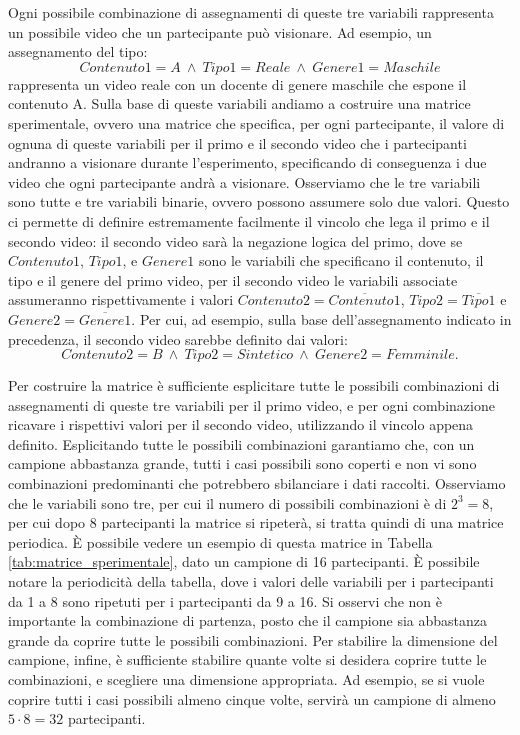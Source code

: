 Ogni possibile combinazione di assegnamenti di queste tre variabili rappresenta un possibile video che un partecipante può visionare. Ad esempio, un assegnamento del tipo: $$Contenuto1 = A \ \wedge \ Tipo1 = Reale \ \wedge \ Genere1 = Maschile$$ rappresenta un video reale con un docente di genere maschile che espone il contenuto A. Sulla base di queste variabili andiamo a costruire una matrice sperimentale, ovvero una matrice che specifica, per ogni partecipante, il valore di ognuna di queste variabili per il primo e il secondo video che i partecipanti andranno a visionare durante l'esperimento, specificando di conseguenza i due video che ogni partecipante andrà a visionare. Osserviamo che le tre variabili sono tutte e tre variabili binarie, ovvero possono assumere solo due valori. Questo ci permette di definire estremamente facilmente il vincolo che lega il primo e il secondo video: il secondo video sarà la negazione logica del primo, dove se $Contenuto1$, $Tipo1$, e $Genere1$ sono le variabili che specificano il contenuto, il tipo e il genere del primo video, per il secondo video le variabili associate assumeranno rispettivamente i valori $Contenuto2 = \overline{Contenuto1}$, $Tipo2 = \overline{Tipo1}$ e $Genere2 = \overline{Genere1}$. Per cui, ad esempio, sulla base dell'assegnamento indicato in precedenza, il secondo video sarebbe definito dai valori: $$Contenuto2 = B \ \wedge \ Tipo2 = Sintetico \ \wedge \ Genere2 = Femminile.$$ 

Per costruire la matrice è sufficiente esplicitare tutte le possibili combinazioni di assegnamenti di queste tre variabili per il primo video, e per ogni combinazione ricavare i rispettivi valori per il secondo video, utilizzando il vincolo appena definito. Esplicitando tutte le possibili combinazioni garantiamo che, con un campione abbastanza grande, tutti i casi possibili sono coperti e non vi sono combinazioni predominanti che potrebbero sbilanciare i dati raccolti. Osserviamo che le variabili sono tre, per cui il numero di possibili combinazioni è di $2^3 = 8$, per cui dopo 8 partecipanti la matrice si ripeterà, si tratta quindi di una matrice periodica. È possibile vedere un esempio di questa matrice in Tabella \ref{tab:matrice_sperimentale}, dato un campione di 16 partecipanti. È possibile notare la periodicità della tabella, dove i valori delle variabili per i  partecipanti da 1 a 8 sono ripetuti per i partecipanti da 9 a 16. Si osservi che non è importante la combinazione di partenza, posto che il campione sia abbastanza grande da coprire tutte le possibili combinazioni. Per stabilire la dimensione del campione, infine, è sufficiente stabilire quante volte si desidera coprire tutte le combinazioni, e scegliere una dimensione appropriata. Ad esempio, se si vuole coprire tutti i casi possibili almeno cinque volte, servirà un campione di almeno $5 \cdot 8 = 32$ partecipanti.

